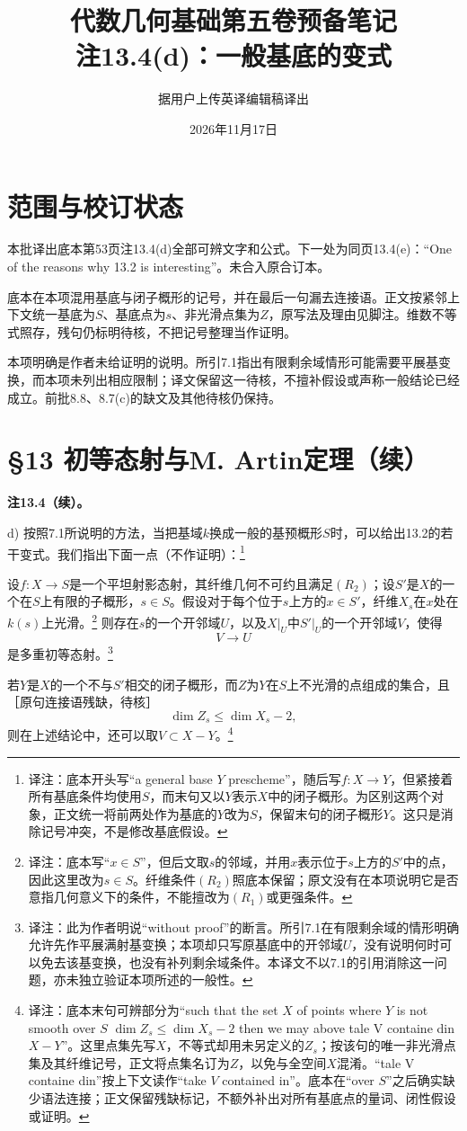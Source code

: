 \documentclass[openany,fontset=fandol]{ctexbook}
\newcommand{\note}[1]{\footnote{译注：#1}}
\begin{document}
\title{代数几何基础第五卷预备笔记\\注13.4(d)：一般基底的变式}
\author{据用户上传英译编辑稿译出}
\date{2026年11月17日}
\maketitle
\chapter*{范围与校订状态}
本批译出底本第53页注13.4(d)全部可辨文字和公式。下一处为同页13.4(e)：“One of the reasons why 13.2 is interesting”。未合入原合订本。

底本在本项混用基底与闭子概形的记号，并在最后一句漏去连接语。正文按紧邻上下文统一基底为$S$、基底点为$s$、非光滑点集为$Z$，原写法及理由见脚注。维数不等式照存，残句仍标明待核，不把记号整理当作证明。

本项明确是作者未给证明的说明。所引7.1指出有限剩余域情形可能需要平展基变换，而本项未列出相应限制；译文保留这一待核，不擅补假设或声称一般结论已经成立。前批8.8、8.7(c)的缺文及其他待核仍保持。
\chapter*{§13 初等态射与M. Artin定理（续）}
\noindent\textbf{注13.4（续）。}

\noindent d) 按照7.1所说明的方法，当把基域$k$换成一般的基预概形$S$时，可以给出13.2的若干变式。我们指出下面一点（不作证明）：\note{底本开头写“a general base $Y$ prescheme”，随后写$f:X\to Y$，但紧接着所有基底条件均使用$S$，而末句又以$Y$表示$X$中的闭子概形。为区别这两个对象，正文统一将前两处作为基底的$Y$改为$S$，保留末句的闭子概形$Y$。这只是消除记号冲突，不是修改基底假设。}

设$f:X\to S$是一个平坦射影态射，其纤维几何不可约且满足$(R_2)$；设$S'$是$X$的一个在$S$上有限的子概形，$s\in S$。假设对于每个位于$s$上方的$x\in S'$，纤维$X_s$在$x$处在$k(s)$上光滑。\note{底本写“$x\in S$”，但后文取$s$的邻域，并用$x$表示位于$s$上方的$S'$中的点，因此这里改为$s\in S$。纤维条件$(R_2)$照底本保留；原文没有在本项说明它是否意指几何意义下的条件，不能擅改为$(R_1)$或更强条件。}
则存在$s$的一个开邻域$U$，以及$X|_U$中$S'|_U$的一个开邻域$V$，使得
\[
V\longrightarrow U
\]
是多重初等态射。\note{此为作者明说“without proof”的断言。所引7.1在有限剩余域的情形明确允许先作平展满射基变换；本项却只写原基底中的开邻域$U$，没有说明何时可以免去该基变换，也没有补列剩余域条件。本译文不以7.1的引用消除这一问题，亦未独立验证本项所述的一般性。}

\newpage
若$Y$是$X$的一个不与$S'$相交的闭子概形，而$Z$为$Y$在$S$上不光滑的点组成的集合，且［原句连接语残缺，待核］
\[
\dim Z_s\leq\dim X_s-2,
\]
则在上述结论中，还可以取$V\subset X-Y$。\note{底本末句可辨部分为“such that the set $X$ of points where $Y$ is not smooth over $S$ $\dim Z_s\leq\dim X_s-2$ then we may above tale V containe din $X-Y$”。这里点集先写$X$，不等式却用未另定义的$Z_s$；按该句的唯一非光滑点集及其纤维记号，正文将点集名订为$Z$，以免与全空间$X$混淆。“tale V containe din”按上下文读作“take $V$ contained in”。底本在“over $S$”之后确实缺少语法连接；正文保留残缺标记，不额外补出对所有基底点的量词、闭性假设或证明。}
\end{document}

